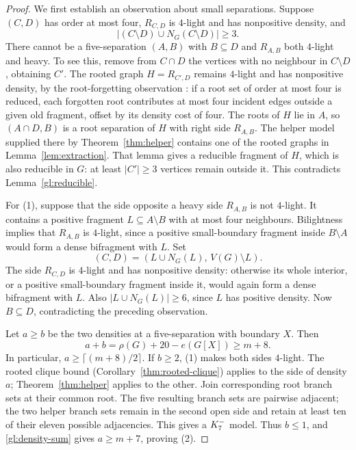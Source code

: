 \begin{proof}
We first establish an observation about small separations. Suppose
$(C,D)$ has order at most four, $R_{C,D}$ is $4$-light and has
nonpositive density, and
\[
 |(C\setminus D)\cup N_G(C\setminus D)|\geq3.
\]
There cannot be a five-separation $(A,B)$ with $B\subseteq D$ and
$R_{A,B}$ both $4$-light and heavy. To see this, remove from $C\cap D$
the vertices with no neighbour in $C\setminus D$, obtaining $C'$.
The rooted graph $H=R_{C',D}$ remains $4$-light and has nonpositive
density, by the root-forgetting observation
\cite[Observation~5.2]{DNR2026}: if a root set of order at most four
is reduced, each forgotten root contributes at most four incident
edges outside a given old fragment, offset by its density cost of four.
The roots of $H$ lie in $A$, so $(A\cap D,B)$ is a root separation
of $H$ with right side $R_{A,B}$. The helper model supplied there by
Theorem~\ref{thm:helper} contains one of the rooted graphs in
Lemma~\ref{lem:extraction}. That lemma gives a reducible fragment
of $H$, which is also reducible in $G$: at least $|C'|\geq3$
vertices remain outside it. This contradicts Lemma~\ref{gl:reducible}.

For (1), suppose that the side opposite a heavy side $R_{A,B}$ is
not $4$-light. It contains a positive fragment $L\subseteq A\setminus B$
with at most four neighbours. Bilightness implies that $R_{A,B}$ is
$4$-light, since a positive small-boundary fragment inside $B\setminus A$
would form a dense bifragment with $L$. Set
\[
 (C,D)=(L\cup N_G(L),\,V(G)\setminus L).
\]
The side $R_{C,D}$ is $4$-light and has nonpositive density: otherwise
its whole interior, or a positive small-boundary fragment inside it,
would again form a dense bifragment with $L$. Also
$|L\cup N_G(L)|\geq6$, since $L$ has positive density. Now
$B\subseteq D$, contradicting the preceding observation.

Let $a\geq b$ be the two densities at a five-separation with boundary
$X$. Then
\begin{equation}\label{gl:density-sum}
 a+b=\rho(G)+20-e(G[X])\geq m+8.
\end{equation}
In particular, $a\geq\lceil(m+8)/2\rceil$. If $b\geq2$, (1) makes
both sides $4$-light. The rooted clique bound
(Corollary~\ref{thm:rooted-clique}) applies to the side of density $a$;
Theorem~\ref{thm:helper} applies to the other. Join corresponding root
branch sets at their common root. The five resulting branch sets
are pairwise adjacent; the two helper branch sets remain in the second
open side and retain at least ten of their eleven possible adjacencies.
This gives a $K_7^{-}$ model. Thus
$b\leq1$, and \eqref{gl:density-sum} gives $a\geq m+7$, proving (2).


\end{proof}
